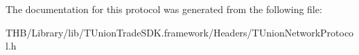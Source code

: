 The documentation for this protocol was generated from the following file\+:\begin{DoxyCompactItemize}
\item 
T\+H\+B/\+Library/lib/\+T\+Union\+Trade\+S\+D\+K.\+framework/\+Headers/T\+Union\+Network\+Protocol.\+h\end{DoxyCompactItemize}

